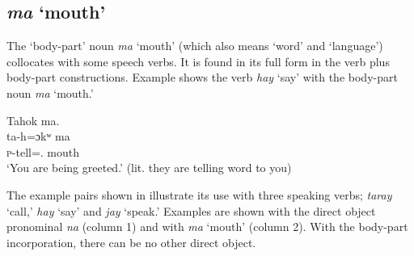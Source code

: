 \subsection{\textit{ma} ‘mouth’}\label{sec:9.3.3}\label{sec:9.3.1.3}

The ‘body-part’ noun \textit{ma} ‘mouth’ (which also means ‘word’ and ‘language’) collocates with some speech verbs. It is found in its full form in the verb plus body-part constructions. Example  shows the verb \textit{hay} ‘say’ with the body-part noun \textit{ma} ‘mouth.’ 

\ea \label{ex:9:57}
Tahok  ma.\\
\gll  ta-h=ɔkʷ    ma\\
      \textsc{p}-tell={\twoS}.{\IO}    mouth\\
\glt  ‘You are being greeted.’ (lit. they are telling word to you) 
\z

The example pairs shown in  illustrate its use with three speaking verbs; \textit{taray} ‘call,’ \textit{hay} ‘say’ and \textit{jay} ‘speak.’ Examples are shown with the direct object pronominal \textit{na} (column 1) and with \textit{ma} ‘mouth’ (column 2). With the body-part incorporation, there can be no other direct object. 

